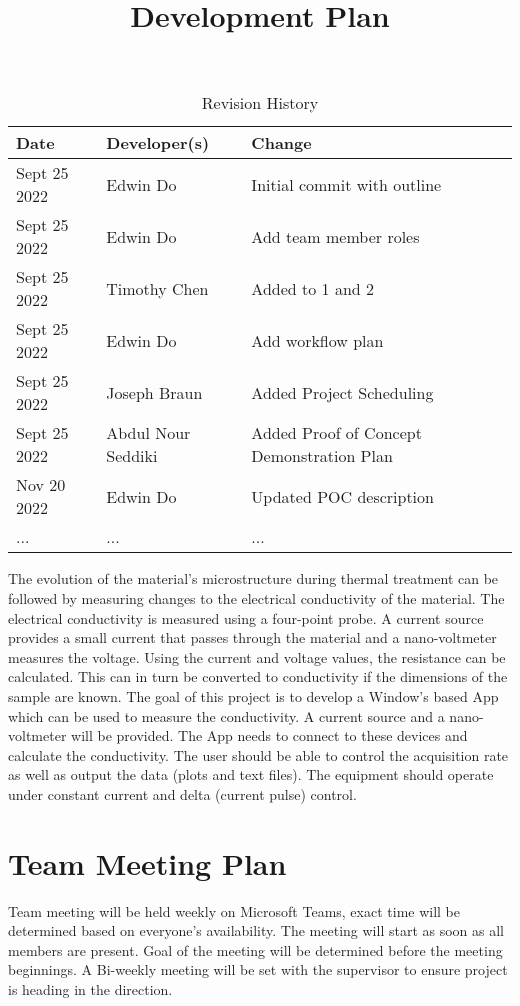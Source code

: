 \documentclass{article}
\title{Development Plan\\\progname}
\author{\authname}
\date{}
\begin{document}
\begin{table}[hp]
\caption{Revision History} \label{TblRevisionHistory}
\begin{tabularx}{\textwidth}{llX}
\toprule
\textbf{Date} & \textbf{Developer(s)} & \textbf{Change}\\
\midrule
Sept 25 2022 & Edwin Do & Initial commit with outline\\
Sept 25 2022 & Edwin Do & Add team member roles\\
Sept 25 2022 & Timothy Chen & Added to 1 and 2\\
Sept 25 2022 & Edwin Do & Add workflow plan \\
Sept 25 2022 & Joseph Braun & Added Project Scheduling \\
Sept 25 2022 & Abdul Nour Seddiki & Added Proof of Concept Demonstration Plan \\
Nov 20 2022 & Edwin Do & Updated POC description \\
... & ... & ...\\
\bottomrule
\end{tabularx}
\end{table}

\newpage

\maketitle

\noindent The evolution of the material’s microstructure during thermal treatment can be followed by measuring changes to the electrical conductivity of the material. The electrical conductivity is measured using a four-point probe. A current source provides a small current that passes through the material and a nano-voltmeter measures the voltage. Using the current and voltage values, the resistance can be calculated. This can in turn be converted to conductivity if the dimensions of the sample are known. The goal of this project is to develop a Window’s based App which can be used to measure the conductivity. A current source and a nano- voltmeter will be provided. The App needs to connect to these devices and calculate the conductivity. The user should be able to control the acquisition rate as well as output the data (plots and text files). The equipment should operate under constant current and delta (current pulse) control.

\section{Team Meeting Plan}
Team meeting will be held weekly on Microsoft Teams, exact time will be determined based on everyone's availability.
The meeting will start as soon as all members are present. 
Goal of the meeting will be determined before the meeting beginnings. 
A Bi-weekly meeting will be set with the supervisor to ensure project is heading in the direction. 
\end{document}
